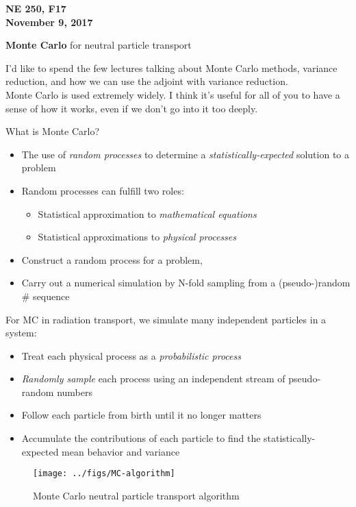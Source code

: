 \documentclass[12pt]{article}
\begin{document}
\begin{center}
{\bf NE 250, F17\\
November 9, 2017 
}
\end{center}

\textbf{Monte Carlo} for neutral particle transport

I'd like to spend the few lectures talking about Monte Carlo methods, variance reduction, and how we can use the adjoint with variance reduction. \\
Monte Carlo is used extremely widely. I think it's useful for all of you to have a sense of how it works, even if we don't go into it too deeply.

What is Monte Carlo?
  \begin{itemize}
  \item The use of \textit{random processes} to determine a \textit{statistically-expected} solution to a problem
  \item Random processes can fulfill two roles:
  \begin{itemize}
    \item Statistical approximation to \textit{mathematical equations}
    \item Statistical approximations to \textit{physical processes}
  \end{itemize}   
  \item Construct a random process for a problem, 
  \item Carry out a numerical simulation by N-fold sampling from a (pseudo-)random \# sequence
\end{itemize}

For MC in radiation transport, we simulate many independent particles in a system:
\begin{itemize}
\item Treat each physical process as a \textit{probabilistic process}
\item \textit{Randomly sample} each process using an independent stream of pseudo-random numbers
\item Follow each particle from birth until it no longer matters
\item Accumulate the contributions of each particle to find the statistically-expected mean behavior and variance
\end{itemize}

\begin{figure}[h!]
\begin{center}
  \texttt{[image: ../figs/MC-algorithm]}
\end{center}
  \caption{Monte Carlo neutral particle transport algorithm}
  \label{fig:mc-algo}
\end{figure}
\end{document}
